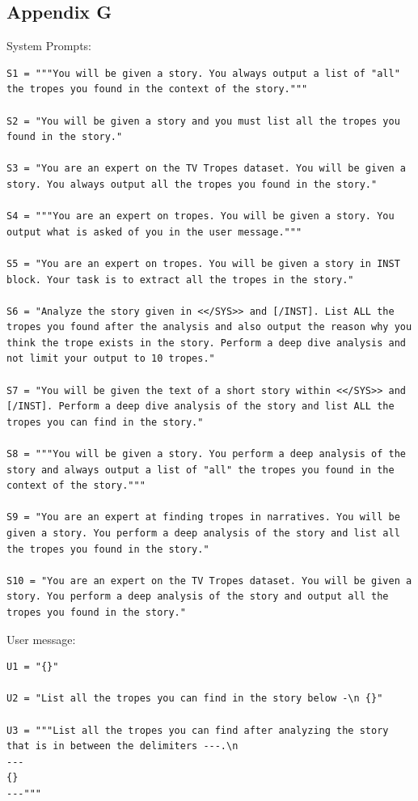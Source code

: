 \documentclass[11pt]{article}
\begin{document}
\subsection{Appendix G}
System Prompts:
\begin{lstlisting}
S1 = """You will be given a story. You always output a list of "all" the tropes you found in the context of the story."""

S2 = "You will be given a story and you must list all the tropes you found in the story."

S3 = "You are an expert on the TV Tropes dataset. You will be given a story. You always output all the tropes you found in the story."

S4 = """You are an expert on tropes. You will be given a story. You output what is asked of you in the user message."""

S5 = "You are an expert on tropes. You will be given a story in INST block. Your task is to extract all the tropes in the story."

S6 = "Analyze the story given in <</SYS>> and [/INST]. List ALL the tropes you found after the analysis and also output the reason why you think the trope exists in the story. Perform a deep dive analysis and not limit your output to 10 tropes."

S7 = "You will be given the text of a short story within <</SYS>> and [/INST]. Perform a deep dive analysis of the story and list ALL the tropes you can find in the story."

S8 = """You will be given a story. You perform a deep analysis of the story and always output a list of "all" the tropes you found in the context of the story."""

S9 = "You are an expert at finding tropes in narratives. You will be given a story. You perform a deep analysis of the story and list all the tropes you found in the story."

S10 = "You are an expert on the TV Tropes dataset. You will be given a story. You perform a deep analysis of the story and output all the tropes you found in the story."
\end{lstlisting}

User message:
\begin{lstlisting}
U1 = "{}"
  
U2 = "List all the tropes you can find in the story below -\n {}"

U3 = """List all the tropes you can find after analyzing the story that is in between the delimiters ---.\n
---
{}
---"""
\end{lstlisting}
\end{document}
